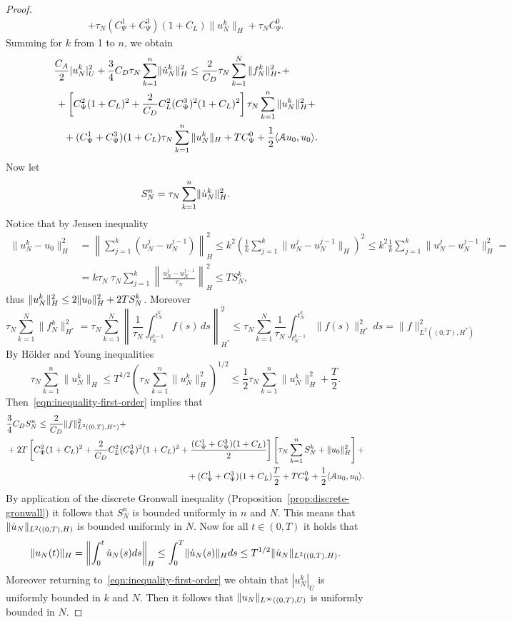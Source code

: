 \documentclass[a4paper,10pt,oneside]{amsbook}
\numberwithin{section}{chapter}
\numberwithin{equation}{chapter}
\theoremstyle{definition}
\DeclarePairedDelimiter{\norm}{\lVert}{\rVert}
\DeclarePairedDelimiter{\dual}{\langle}{\rangle}
\begin{document}
\begin{proof}
\[\begin{multlined}
+\tau_N(C_\Psi^1+C_\Psi^3)(1+C_L)\|u_N^k\|_H+\tau_NC_\Psi^0.
\end{multlined}
\]
Summing for $k$ from 1 to $n$, we obtain
\begin{equation}
\label{eqn:inequality-first-order}
\begin{multlined}
\frac{C_A}{2}|u_N^k|_U^2+\frac{3}{4}C_D\tau_N\sum_{k=1}^n\norm{\dot u_N^k}_H^2\le\frac{2}{C_D}\tau_N\sum_{k=1}^N\|f_N^k\|_{H^*}^2+\\
+\left[C_\Psi^2(1+C_L)^2+\frac{2}{C_D}C_L^2(C_\Psi^3)^2(1+C_L)^2\right]\tau_N\sum_{k=1}^n\|u_N^k\|_H^2+\\
+(C_\Psi^1+C_\Psi^3)(1+C_L)\tau_N\sum_{k=1}^n\|u_N^k\|_H+TC_\Psi^0+\frac{1}{2}\dual{\mathcal{A}u_0,u_0}.
\end{multlined}
\end{equation}
Now let
\[
S_N^n=\tau_N\sum_{k=1}^n\norm{\dot u_N^k}_H^2.
\]
Notice that by Jensen inequality
\[
\begin{split}
\|u_N^k-u_0\|_H^2&=\left\|\sum_{j=1}^k({u}_N^j-{u}_N^{j-1})\right\|_H^2\le k^2\left(\frac{1}{k}\sum_{j=1}^k\|{u}_N^j-{u}_N^{j-1}\|_H\right)^2\le k^2\frac{1}{k}\sum_{j=1}^k\|{u}_N^j-{u}_N^{j-1}\|_H^2=\\
&=k\tau_N\;\tau_N\sum_{j=1}^k\left\|\frac{{u}_N^j-{u}_N^{j-1}}{\tau_N}\right\|_H^2\le TS_N^k,
\end{split}
\]
thus $\norm{u_N^k}_H^2\le2\norm{u_0}_H^2+2TS_N^k$. Moreover
\[
\tau_N\sum_{k=1}^N\|f_N^k\|_{H^*}^2=\tau_N\sum_{k=1}^N\left\|\frac{1}{\tau_N}\int_{t_N^{k-1}}^{t_N^k}f(s)\,ds\right\|_{H^*}^2\le\tau_N\sum_{k=1}^N\frac{1}{\tau_N}\int_{t_N^{k-1}}^{t_N^k}\|f(s)\|_{H^*}^2\,ds=\|f\|_{L^2((0,T),H^*)}^2
\]
By H\"older and Young inequalities
\[
\tau_N\sum_{k=1}^n\|u_N^k\|_H\le T^{1/2}\left(\tau_N\sum_{k=1}^n\|u_N^k\|_H^2\right)^{1/2}\le\frac{1}{2}\tau_N\sum_{k=1}^n\|u_N^k\|_H^2+\frac{T}{2}.
\]
Then~\eqref{eqn:inequality-first-order} implies that
\[
\begin{multlined}
\frac{3}{4}C_DS_N^n\le\frac{2}{C_D}\|f\|_{L^2((0,T),H^*)}^2+\\
+2T\left[C_\Psi^2(1+C_L)^2+\frac{2}{C_D}C_L^2(C_\Psi^3)^2(1+C_L)^2+\frac{(C_\Psi^1+C_\Psi^3)(1+C_L)}{2}\right]\left[\tau_N\sum_{k=1}^nS_N^k+\norm{u_0}_H^2\right]+\\
+(C_\Psi^1+C_\Psi^3)(1+C_L)\frac{T}{2}+TC_\Psi^0+\frac{1}{2}\dual{\mathcal{A}u_0,u_0}.
\end{multlined}
\]
By application of the discrete Gronwall inequality (Proposition~\ref{prop:discrete-gronwall}) it follows that $S_N^n$ is bounded uniformly in $n$ and $N$. This means that $\norm{\dot u_N}_{L^2((0,T),H)}$ is bounded uniformly in $N$. Now for all $t\in(0,T)$ it holds that
\[
\norm{u_N(t)}_H=\left\|\int_0^t\dot u_N(s)ds\right\|_H\le\int_0^T\norm{\dot u_N(s)}_Hds\le T^{1/2}\norm{\dot u_N}_{L^2((0,T),H)}.
\]
Moreover returning to~\eqref{eqn:inequality-first-order} we obtain that $|u_N^k|_U$ is uniformly bounded in $k$ and $N$. Then it follows that $\norm{u_N}_{L^\infty((0,T),U)}$ is uniformly bounded in $N$.
\end{proof}
\end{document}
